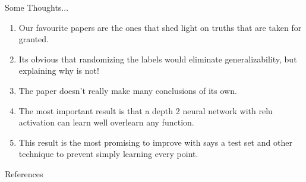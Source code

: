 \documentclass[10pt]{beamer}
\begin{document}
\begin{frame}{Some Thoughts... }
	\begin{enumerate}
		\item Our favourite papers are the ones that shed light on truths that are taken for granted.
		\item Its obvious that randomizing the labels would eliminate generalizability, but explaining why is not!
		\item The paper doesn't really make many conclusions of its own.
		\item The most important result is that a depth 2 neural network with relu activation can learn well overlearn any function.
		\item This result is the most promising to improve with says a test set and other technique to prevent simply learning every point.
	\end{enumerate}

	
	
	
	
\end{frame}	

\begin{frame}{References}


\end{frame}	
	
\end{document}
